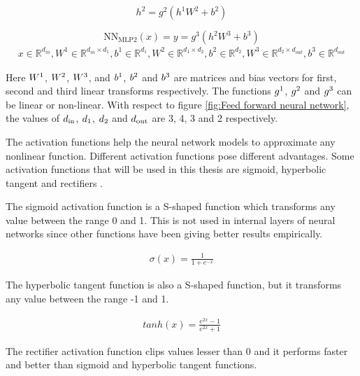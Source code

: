\documentclass[a4paper, 11pt]{article}
\newcommand{\R}{\mathbb{R}}
\begin{document}
\begin{equation}
h^2 = g^2(h^1W^2 + b^2)
\end{equation}

\begin{equation} \label{equ: feed forward output layer}
\mathrm{NN_{MLP2}}(x) = y = g^3(h^2W^3 + b^3)
\end{equation}
\begin{align*}
x \in \R^{d_{in}}, W^1 \in \R^{d_{in} \times d_1}, b^1 \in \R^{d_1}, W^2 \in \R^{d_1 \times d_2}, b^2 \in \R^{d_2}, W^3 \in \R^{d_2 \times d_{out}}, b^3 \in \R^{d_{out}}
\end{align*}

Here $W\textsuperscript{1}$, $W\textsuperscript{2}$, $W\textsuperscript{3}$,  and $b\textsuperscript{1}$, $b\textsuperscript{2}$ and $b\textsuperscript{3}$ are matrices and bias vectors for first, second and third linear transforms respectively. The functions $g\textsuperscript{1}$, $g\textsuperscript{2}$ and $g\textsuperscript{3}$ can be linear or non-linear. With respect to figure \ref{fig:Feed forward neural network}, the values of $d\textsubscript{in}$, $d\textsubscript{1}$, $d\textsubscript{2}$ and $d\textsubscript{out}$ are 3, 4, 3 and 2 respectively. 

The activation functions help the neural network models to approximate any nonlinear function. Different activation functions pose different advantages. Some activation functions that will be used in this thesis are sigmoid, hyperbolic tangent and rectifiers \cite{Goldberg2016}.

The sigmoid activation function is a S-shaped function which transforms any value between the range 0 and 1. This is not used in internal layers of neural networks since other functions have been giving better results empirically. 

\begin{align*}
\sigma (x) = \frac{1}{1 + e^{-x}}
\end{align*} 

The hyperbolic tangent function is also a S-shaped function, but it transforms any value between the range -1 and 1.

\begin{align*}
tanh(x) = \frac{e^{2x}-1}{e^{2x}+1}
\end{align*}

The rectifier activation function clips values lesser than 0 and it performs faster and better than sigmoid and hyperbolic tangent functions.
\end{document}
